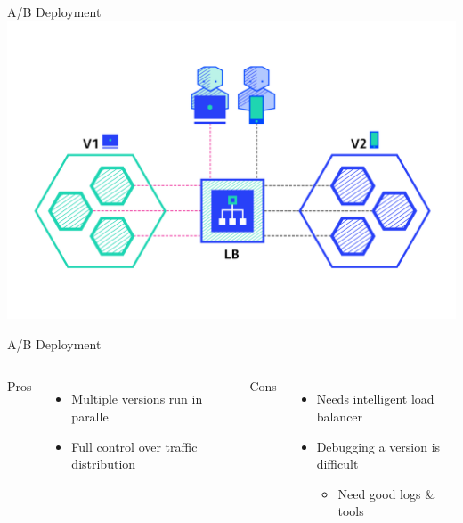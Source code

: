 \documentclass{slide}
\begin{document}
\begin{frame}{A/B Deployment \cite{deployment-strategies}}
    \vspace{1pt}
    \centering
    \includegraphics[height=\textheight]{diagrams/a-b/fnum19.png}
\end{frame}

\begin{frame}{A/B Deployment}
    \vspace{1pt}
    \begin{columns}[t]
      \huge Pros
      {\LARGE
        \begin{itemize}
            \item Multiple versions run in parallel
            \item Full control over traffic distribution
        \end{itemize}
      }
      \huge Cons
      {\LARGE
        \begin{itemize}
            \item Needs intelligent load balancer
            \vspace{2mm}
            \item Debugging a version is difficult
            \begin{itemize}
                \Large\item Need good logs \& tools
            \end{itemize}
        \end{itemize}
      }
    \end{columns}
\end{frame}
\end{document}
